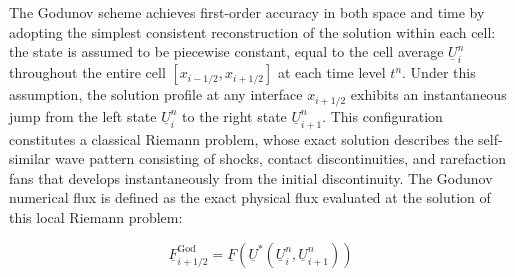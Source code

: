 The Godunov scheme achieves first-order accuracy in both space and time by adopting the simplest consistent reconstruction of the solution within each cell: the state is assumed to be piecewise constant, equal to the cell average \( \underline{U}_i^n \) throughout the entire cell \( [x_{i-1/2}, x_{i+1/2}] \) at each time level \( t^n \). Under this assumption, the solution profile at any interface \( x_{i+1/2} \) exhibits an instantaneous jump from the left state \( \underline{U}_i^n \) to the right state \( \underline{U}_{i+1}^n \). This configuration constitutes a classical Riemann problem, whose exact solution describes the self-similar wave pattern consisting of shocks, contact discontinuities, and rarefaction fans that develops instantaneously from the initial discontinuity. The Godunov numerical flux is defined as the exact physical flux evaluated at the solution of this local Riemann problem:

\begin{equation}
\underline{F}_{i+1/2}^{\mathrm{God}} = \underline{F}\left(\underline{U}^*\left(\underline{U}_i^n, \underline{U}_{i+1}^n\right)\right)
\label{eq:godunov_flux}
\end{equation}


